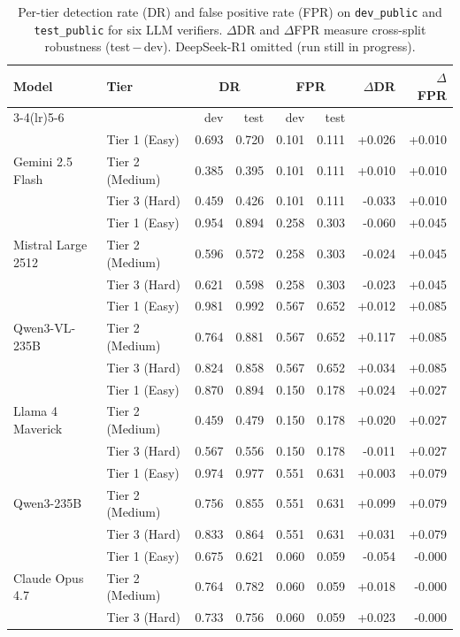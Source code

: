 \begin{table}[t]
\centering
\caption{Per-tier detection rate (DR) and false positive rate (FPR) on \texttt{dev\_public} and \texttt{test\_public} for six LLM verifiers. $\Delta$DR and $\Delta$FPR measure cross-split robustness (test\,$-$\,dev). DeepSeek-R1 omitted (run still in progress).}
\label{tab:cross-split-per-tier}
\small
\begin{tabular}{llrrrrrr}
\toprule
Model & Tier & \multicolumn{2}{c}{DR} & \multicolumn{2}{c}{FPR} & $\Delta$DR & $\Delta$FPR \\
\cmidrule(lr){3-4}\cmidrule(lr){5-6}
& & dev & test & dev & test & & \\
\midrule
\multirow{3}{*}{Gemini 2.5 Flash} & Tier 1 (Easy) & 0.693 & 0.720 & 0.101 & 0.111 & +0.026 & +0.010 \\
 & Tier 2 (Medium) & 0.385 & 0.395 & 0.101 & 0.111 & +0.010 & +0.010 \\
 & Tier 3 (Hard) & 0.459 & 0.426 & 0.101 & 0.111 & -0.033 & +0.010 \\
\midrule
\multirow{3}{*}{Mistral Large 2512} & Tier 1 (Easy) & 0.954 & 0.894 & 0.258 & 0.303 & -0.060 & +0.045 \\
 & Tier 2 (Medium) & 0.596 & 0.572 & 0.258 & 0.303 & -0.024 & +0.045 \\
 & Tier 3 (Hard) & 0.621 & 0.598 & 0.258 & 0.303 & -0.023 & +0.045 \\
\midrule
\multirow{3}{*}{Qwen3-VL-235B} & Tier 1 (Easy) & 0.981 & 0.992 & 0.567 & 0.652 & +0.012 & +0.085 \\
 & Tier 2 (Medium) & 0.764 & 0.881 & 0.567 & 0.652 & +0.117 & +0.085 \\
 & Tier 3 (Hard) & 0.824 & 0.858 & 0.567 & 0.652 & +0.034 & +0.085 \\
\midrule
\multirow{3}{*}{Llama 4 Maverick} & Tier 1 (Easy) & 0.870 & 0.894 & 0.150 & 0.178 & +0.024 & +0.027 \\
 & Tier 2 (Medium) & 0.459 & 0.479 & 0.150 & 0.178 & +0.020 & +0.027 \\
 & Tier 3 (Hard) & 0.567 & 0.556 & 0.150 & 0.178 & -0.011 & +0.027 \\
\midrule
\multirow{3}{*}{Qwen3-235B} & Tier 1 (Easy) & 0.974 & 0.977 & 0.551 & 0.631 & +0.003 & +0.079 \\
 & Tier 2 (Medium) & 0.756 & 0.855 & 0.551 & 0.631 & +0.099 & +0.079 \\
 & Tier 3 (Hard) & 0.833 & 0.864 & 0.551 & 0.631 & +0.031 & +0.079 \\
\midrule
\multirow{3}{*}{Claude Opus 4.7} & Tier 1 (Easy) & 0.675 & 0.621 & 0.060 & 0.059 & -0.054 & -0.000 \\
 & Tier 2 (Medium) & 0.764 & 0.782 & 0.060 & 0.059 & +0.018 & -0.000 \\
 & Tier 3 (Hard) & 0.733 & 0.756 & 0.060 & 0.059 & +0.023 & -0.000 \\
\bottomrule
\end{tabular}
\end{table}
